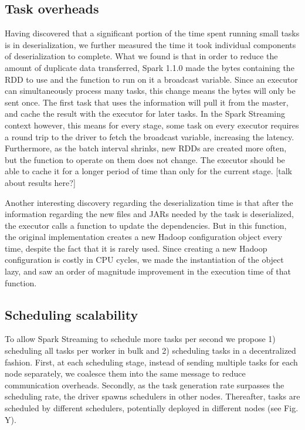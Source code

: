 \subsection{Task overheads}
Having discovered that a significant portion of the time spent running small tasks is in deserialization, we further measured the time it took individual components of deserialization to complete. What we found is that in order to reduce the amount of duplicate data transferred, Spark 1.1.0 made the bytes containing the RDD to use and the function to run on it a broadcast variable. Since an executor can simultaneously process many tasks, this change means the bytes will only be sent once. The first task that uses the information will pull it from the master, and cache the result with the executor for later tasks. In the Spark Streaming context however, this means for every stage, some task on every executor requires a round trip to the driver to fetch the broadcast variable, increasing the latency. Furthermore, as the batch interval shrinks, new RDDs are created more often, but the function to operate on them does not change. The executor should be able to cache it for a longer period of time than only for the current stage. [talk about results here?]

Another interesting discovery regarding the deserialization time is that after the information regarding the new files and JARs needed by the task is deserialized, the executor calls a function to update the dependencies. But in this function, the original implementation creates a new Hadoop configuration object every time, despite the fact that it is rarely used. Since creating a new Hadoop configuration is costly in CPU cycles, we made the instantiation of the object lazy, and saw an order of magnitude improvement in the execution time of that function.



\subsection{Scheduling scalability}

To allow Spark Streaming to schedule more tasks per second we propose 1) scheduling all tasks per worker in bulk and 2) scheduling tasks in a decentralized fashion.
First, at each scheduling stage, instead of sending multiple tasks for each node separately, we coalesce them into the same message to reduce communication overheads.
Secondly, as the task generation rate surpasses the scheduling rate, the driver spawns schedulers in other nodes. Thereafter, tasks are scheduled by different schedulers, potentially deployed in different nodes (see Fig. Y).

